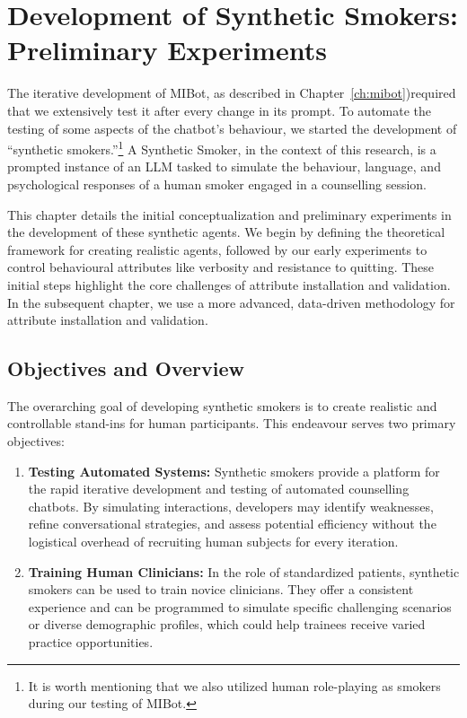 \chapter{Development of Synthetic Smokers: Preliminary Experiments}
\label{ch:synthetic-smoker-preliminary}

The iterative development of MIBot, as described in Chapter~\ref{ch:mibot})required that we extensively test it after every change in its prompt. To automate the testing of some aspects of the chatbot's behaviour, we started the development of ``synthetic smokers.''\footnote{It is worth mentioning that we also utilized human role-playing as smokers during our testing of MIBot.} A Synthetic Smoker, in the context of this research, is a prompted instance of an LLM tasked to simulate the behaviour, language, and psychological responses of a human smoker engaged in a counselling session.

This chapter details the initial conceptualization and preliminary experiments in the development of these synthetic agents. We begin by defining the theoretical framework for creating realistic agents, followed by our early experiments to control behavioural attributes like verbosity and resistance to quitting. These initial steps highlight the core challenges of attribute installation and validation. In the subsequent chapter, we use a more advanced,  data-driven methodology for attribute installation and validation.

\section{Objectives and Overview}
\label{sec:synthetic-smoker-goals}

The overarching goal of developing synthetic smokers is to create realistic and controllable stand-ins for human participants. This endeavour serves two primary objectives:

\begin{enumerate}
    \item \textbf{Testing Automated Systems:} Synthetic smokers provide a platform for the rapid iterative development and testing of automated counselling chatbots. By simulating interactions, developers may identify weaknesses, refine conversational strategies, and assess potential efficiency without the logistical overhead of recruiting human subjects for every iteration.
    \item \textbf{Training Human Clinicians:} In the role of standardized patients, synthetic smokers can be used to train novice clinicians. They offer a consistent experience and can be programmed to simulate specific challenging scenarios or diverse demographic profiles, which could help trainees receive varied practice opportunities.
\end{enumerate}

